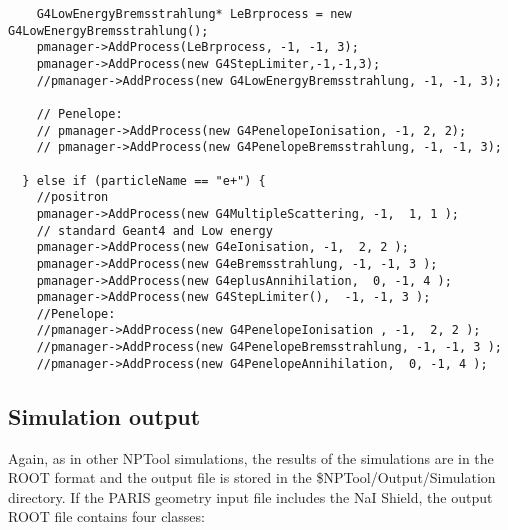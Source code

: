 \documentclass[a4paper,12pt]{article}
\begin{document}
\begin{verbatim}
    G4LowEnergyBremsstrahlung* LeBrprocess = new G4LowEnergyBremsstrahlung();
    pmanager->AddProcess(LeBrprocess, -1, -1, 3);
    pmanager->AddProcess(new G4StepLimiter,-1,-1,3);
    //pmanager->AddProcess(new G4LowEnergyBremsstrahlung, -1, -1, 3);
    
    // Penelope:
    // pmanager->AddProcess(new G4PenelopeIonisation, -1, 2, 2);
    // pmanager->AddProcess(new G4PenelopeBremsstrahlung, -1, -1, 3);
    
  } else if (particleName == "e+") {
    //positron
    pmanager->AddProcess(new G4MultipleScattering, -1,  1, 1 );
    // standard Geant4 and Low energy
    pmanager->AddProcess(new G4eIonisation, -1,  2, 2 );
    pmanager->AddProcess(new G4eBremsstrahlung, -1, -1, 3 );
    pmanager->AddProcess(new G4eplusAnnihilation,  0, -1, 4 );
    pmanager->AddProcess(new G4StepLimiter(),  -1, -1, 3 );
    //Penelope:
    //pmanager->AddProcess(new G4PenelopeIonisation , -1,  2, 2 );
    //pmanager->AddProcess(new G4PenelopeBremsstrahlung, -1, -1, 3 );
    //pmanager->AddProcess(new G4PenelopeAnnihilation,  0, -1, 4 );
\end{verbatim}  
\normalsize

\subsection{Simulation output}
Again, as in other NPTool simulations, the results of the simulations are in the ROOT format 
and the output file is stored in the \$NPTool/Output/Simulation directory. If the PARIS 
geometry input file includes the NaI Shield, the output ROOT file contains four classes:
\end{document}
